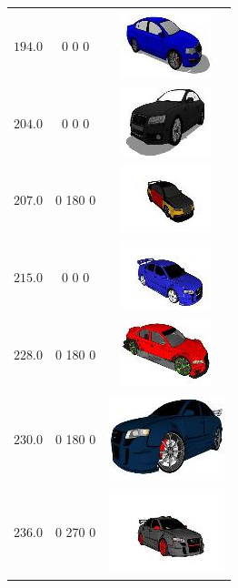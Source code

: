 \begin{longtable}{ccc}
	$194.0$ & 0 0 0 & \includegraphics{models/c69f0f451dc3088466bebffede4668fb.jpg}\\
	$204.0$ & 0 0 0 & \includegraphics{models/98a1a92a94a025aed28935fb3c99dc7e.jpg}\\
	$207.0$ & 0 180 0 & \includegraphics{models/556ec1ccfcb79f08a7fd25564c2e888e.jpg}\\
	$215.0$ & 0 0 0 & \includegraphics{models/516d59c753cc3592437c534ce64aed50.jpg}\\
	$228.0$ & 0 180 0 & \includegraphics{models/c008755cd9f1e270de4da9c35e44df8e.jpg}\\
	$230.0$ & 0 180 0 & \includegraphics{models/a4535ed794217638b140ac690a848850.jpg}\\
	$236.0$ & 0 270 0 & \includegraphics{models/4de61edaa8e41c3a53c5346b68828e77.jpg}\\

\end{longtable}
